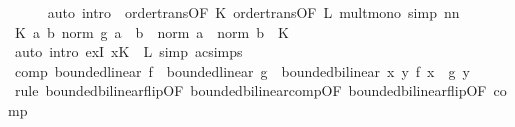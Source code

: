 \begin{isabellebody}
\ \ \ \ \isamarkupfalse%
\ {\isacharparenleft}{\kern0pt}auto\ intro{\isacharbang}{\kern0pt}{\isacharcolon}{\kern0pt}\ \ order{\isacharunderscore}{\kern0pt}trans{\isacharbrackleft}{\kern0pt}OF\ K{\isacharbrackright}{\kern0pt}\ order{\isacharunderscore}{\kern0pt}trans{\isacharbrackleft}{\kern0pt}OF\ L{\isacharbrackright}{\kern0pt}\ mult{\isacharunderscore}{\kern0pt}mono\ simp{\isacharcolon}{\kern0pt}\ nn{\isacharparenright}{\kern0pt}\isanewline
\ \ \isamarkupfalse%
\ \isamarkupfalse%
\ {\isachardoublequoteopen}{\isasymexists}K{\isachardot}{\kern0pt}\ {\isasymforall}a\ b{\isachardot}{\kern0pt}\ norm\ {\isacharparenleft}{\kern0pt}g\ a\ {\isacharasterisk}{\kern0pt}{\isacharasterisk}{\kern0pt}\ b{\isacharparenright}{\kern0pt}\ {\isasymle}\ norm\ a\ {\isacharasterisk}{\kern0pt}\ norm\ b\ {\isacharasterisk}{\kern0pt}\ K{\isachardoublequoteclose}\isanewline
\ \ \ \ \isamarkupfalse%
\ {\isacharparenleft}{\kern0pt}auto\ intro{\isacharbang}{\kern0pt}{\isacharcolon}{\kern0pt}\ exI{\isacharbrackleft}{\kern0pt}\ x{\isacharequal}{\kern0pt}{\isachardoublequoteopen}K\ {\isacharasterisk}{\kern0pt}\ L{\isachardoublequoteclose}{\isacharbrackright}{\kern0pt}\ simp{\isacharcolon}{\kern0pt}\ ac{\isacharunderscore}{\kern0pt}simps{\isacharparenright}{\kern0pt}\isanewline
{}\isamarkupfalse%
%
\endisatagproof
{\isafoldproof}%
%
\isadelimproof
\isanewline
%
\endisadelimproof
\isanewline
{}\isamarkupfalse%
\ comp{\isacharcolon}{\kern0pt}\ {\isachardoublequoteopen}bounded{\isacharunderscore}{\kern0pt}linear\ f\ {\isasymLongrightarrow}\ bounded{\isacharunderscore}{\kern0pt}linear\ g\ {\isasymLongrightarrow}\ bounded{\isacharunderscore}{\kern0pt}bilinear\ {\isacharparenleft}{\kern0pt}{\isasymlambda}x\ y{\isachardot}{\kern0pt}\ f\ x\ {\isacharasterisk}{\kern0pt}{\isacharasterisk}{\kern0pt}\ g\ y{\isacharparenright}{\kern0pt}{\isachardoublequoteclose}\isanewline
%
\isadelimproof
\ \ %
\endisadelimproof
%
\isatagproof
{}\isamarkupfalse%
\ {\isacharparenleft}{\kern0pt}rule\ bounded{\isacharunderscore}{\kern0pt}bilinear{\isachardot}{\kern0pt}flip{\isacharbrackleft}{\kern0pt}OF\ bounded{\isacharunderscore}{\kern0pt}bilinear{\isachardot}{\kern0pt}comp{}{\isacharbrackleft}{\kern0pt}OF\ bounded{\isacharunderscore}{\kern0pt}bilinear{\isachardot}{\kern0pt}flip{\isacharbrackleft}{\kern0pt}OF\ comp{}{\isacharbrackright}{\kern0pt}{\isacharbrackright}{\kern0pt}{\isacharbrackright}{\kern0pt}{\isacharparenright}{\kern0pt}%
\endisatagproof
{\isafoldproof}%
%

\end{isabellebody}
